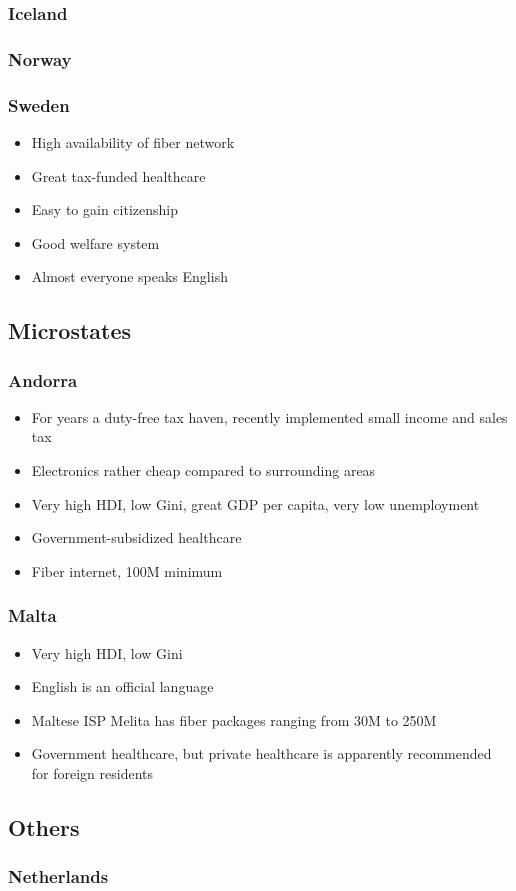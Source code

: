 \documentclass[12pt]{article}
\begin{document}
\subsubsection{Iceland}

\subsubsection{Norway}

\subsubsection{Sweden}
\begin{itemize}
\item High availability of fiber network
\item Great tax-funded healthcare
\item Easy to gain citizenship 
\item Good welfare system
\item Almost everyone speaks English
\end{itemize}


\subsection{Microstates}


\subsubsection{Andorra}

\begin{itemize}
\item For years a duty-free tax haven, recently implemented small income and sales tax
\item Electronics rather cheap compared to surrounding areas
\item Very high HDI, low Gini, great GDP per capita, very low unemployment
\item Government-subsidized healthcare
\item Fiber internet, 100M minimum
\end{itemize}



\subsubsection{Malta}

\begin{itemize}
\item Very high HDI, low Gini
\item English is an official language
\item Maltese ISP Melita has fiber packages ranging from 30M to 250M
\item Government healthcare, but private healthcare is apparently recommended for foreign residents
\end{itemize}

\subsection{Others}


\subsubsection{Netherlands}
\end{document}
